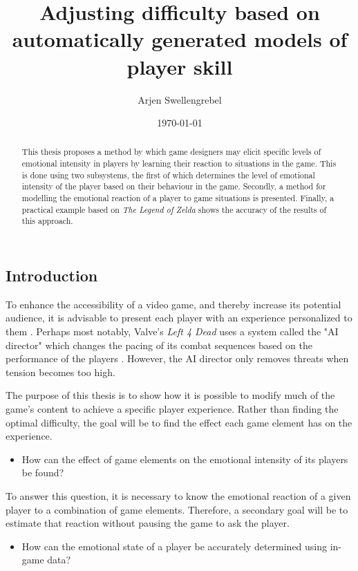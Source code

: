 \documentclass[a4paper]{article}
\title{Adjusting difficulty based on automatically generated models of player skill}
\author{Arjen Swellengrebel}
\date{\today}
\begin{document}
\maketitle

\begin{multicols*}{2}
\begin{abstract}
This thesis proposes a method by which game designers may elicit specific levels of emotional intensity in players by learning their reaction to situations in the game.
This is done using two subsystems, the first of which determines the level of emotional intensity of the player based on their behaviour in the game.
Secondly, a method for modelling the emotional reaction of a player to game situations is presented.
Finally, a practical example based on \emph{The Legend of Zelda} shows the accuracy of the results of this approach.
\end{abstract}

\section{Introduction}
To enhance the accessibility of a video game, and thereby increase its potential audience, it is advisable to present each player with an experience personalized to them \cite{playercentered}. Perhaps most notably, Valve's \emph{Left 4 Dead} uses a system called the "AI director" which changes the pacing of its combat sequences based on the performance of the players \cite{left4dead}. However, the AI director only removes threats when tension becomes too high.

The purpose of this thesis is to show how it is possible to modify much of the game's content to achieve a specific player experience. Rather than finding the optimal difficulty, the goal will be to find the effect each game element has on the experience.
\begin{itemize} \item[\textbf{1.}] How can the effect of game elements on the emotional intensity of its players be found? \end{itemize}
To answer this question, it is necessary to know the emotional reaction of a given player to a combination of game elements. Therefore, a secondary goal will be to estimate that reaction without pausing the game to ask the player.
\begin{itemize} \item[\textbf{2.}] How can the emotional state of a player be accurately determined using in-game data? \end{itemize}


\end{multicols*}
\end{document}
